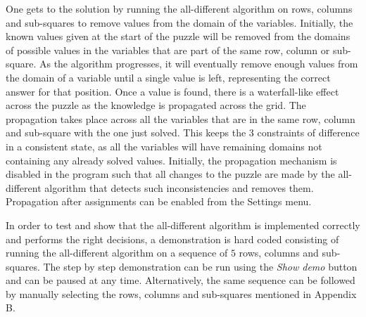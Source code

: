 \documentclass{l4proj}
\begin{document}
\noindent One gets to the solution by running the all-different algorithm on rows, columns and sub-squares to remove values from the domain of the variables. Initially, the known values given at the start of the puzzle will be removed from the domains of possible values in the variables that are part of the same row, column or sub-square. As the algorithm progresses, it will eventually remove enough values from the domain of a variable until a single value is left, representing the correct answer for that position. Once a value is found, there is a waterfall-like effect across the puzzle as the knowledge is propagated across the grid. The propagation takes place across all the variables that are in the same row, column and sub-square with the one just solved. This keeps the 3 constraints of difference in a consistent state, as all the variables will have remaining domains not containing any already solved values. Initially, the propagation mechanism is disabled in the program such that all changes to the puzzle are made by the all-different algorithm that detects such inconsistencies and removes them. Propagation after assignments can be enabled from the Settings menu.

\noindent In order to test and show that the all-different algorithm is implemented correctly and performs the right decisions, a demonstration is hard coded consisting of running the all-different algorithm on a sequence of $5$ rows, columns and sub-squares. The step by step demonstration can be run using the \textit{Show demo} button and can be paused at any time. Alternatively, the same sequence can be followed by manually selecting the rows, columns and sub-squares mentioned in Appendix B.
\end{document}
